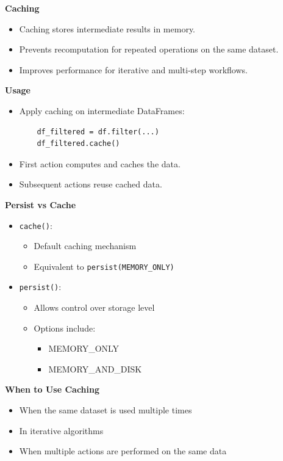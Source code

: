 \documentclass[10pt,a4paper]{article}
\begin{document}
	\textbf{Caching}
	\begin{itemize}
	    \item Caching stores intermediate results in memory.
	    \item Prevents recomputation for repeated operations on the same dataset.
	    \item Improves performance for iterative and multi-step workflows.
	\end{itemize}
	
	\textbf{Usage}
	\begin{itemize}
	    \item Apply caching on intermediate DataFrames:
	\begin{verbatim}
	df_filtered = df.filter(...)
	df_filtered.cache()
	\end{verbatim}
	    \item First action computes and caches the data.
	    \item Subsequent actions reuse cached data.
	\end{itemize}
	
	\textbf{Persist vs Cache}
	\begin{itemize}
	    \item \texttt{cache()}:
	    \begin{itemize}
	        \item Default caching mechanism
	        \item Equivalent to \texttt{persist(MEMORY\_ONLY)}
	    \end{itemize}
	    
	    \item \texttt{persist()}:
	    \begin{itemize}
	        \item Allows control over storage level
	        \item Options include:
	        \begin{itemize}
	            \item MEMORY\_ONLY
	            \item MEMORY\_AND\_DISK
	        \end{itemize}
	    \end{itemize}
	\end{itemize}
	
	\textbf{When to Use Caching}
	\begin{itemize}
	    \item When the same dataset is used multiple times
	    \item In iterative algorithms
	    \item When multiple actions are performed on the same data
	\end{itemize}
	
\end{document}

